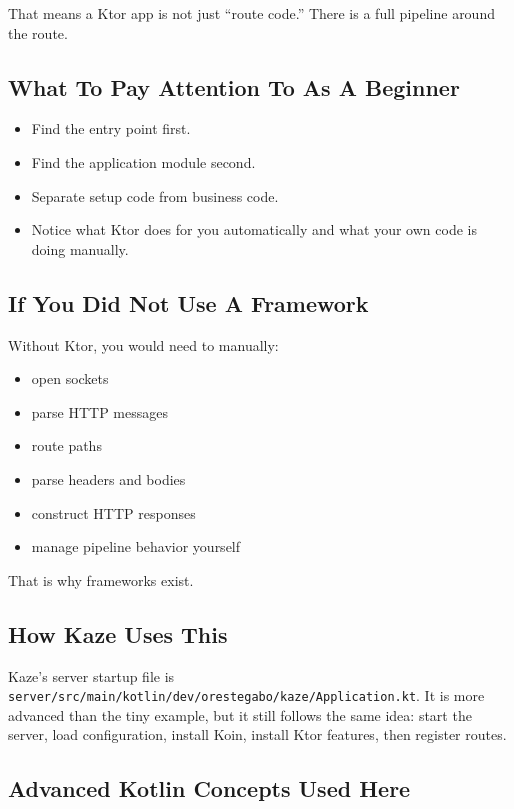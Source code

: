 \documentclass[11pt,a4paper]{article}
\begin{document}
That means a Ktor app is not just ``route code.'' There is a full pipeline around the route.

\subsection{What To Pay Attention To As A Beginner}

\begin{itemize}
    \item Find the entry point first.
    \item Find the application module second.
    \item Separate setup code from business code.
    \item Notice what Ktor does for you automatically and what your own code is doing manually.
\end{itemize}

\subsection{If You Did Not Use A Framework}

Without Ktor, you would need to manually:
\begin{itemize}
    \item open sockets
    \item parse HTTP messages
    \item route paths
    \item parse headers and bodies
    \item construct HTTP responses
    \item manage pipeline behavior yourself
\end{itemize}

That is why frameworks exist.

\subsection{How Kaze Uses This}

Kaze's server startup file is \texttt{server/src/main/kotlin/dev/orestegabo/kaze/Application.kt}. It is more advanced than the tiny example, but it still follows the same idea: start the server, load configuration, install Koin, install Ktor features, then register routes.

\subsection{Advanced Kotlin Concepts Used Here}
\end{document}
